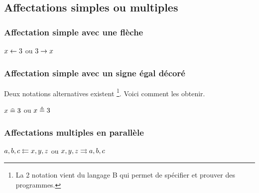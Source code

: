 \documentclass[12pt,a4paper]{article}
\theoremstyle{definition}
\begin{document}

\subsection{Affectations simples ou multiples}

\subsubsection{Affectation simple avec une flèche}

\begin{latexex}
$x \Store 3$ ou
$3 \rightarrow x$
\end{latexex}




\subsubsection{Affectation simple avec un signe égal décoré}

Deux notations alternatives existent
\footnote{
	La 2\ieme{} notation vient du langage B qui permet de spécifier et prouver des programmes.
}.
Voici comment les obtenir.

\begin{latexex}
$x \Store* 3$ ou
$x \Store** 3$
\end{latexex}




\subsubsection{Affectations multiples en parallèle}

\begin{latexex}
$a, b, c \leftleftarrows x, y, z$ ou
$x, y, z \rightrightarrows a, b, c$
\end{latexex}
\end{document}
